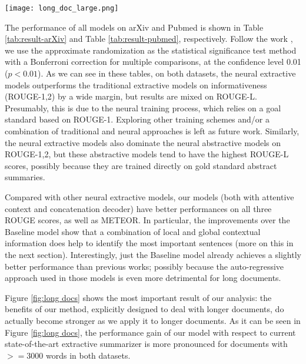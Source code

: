 \begin{figure*}[htbp!]
    \centering
    \texttt{[image: long\_doc\_large.png]}
    \caption{A Comparison between our model, SummaRuNNer and Oracle when applied to documents with increasing length, left-up: ROUGE-1 on Pubmed dataset, right-up: ROUGE-2 on Pubmed dataset, left-down: ROUGE-1 on arXiv dataset, right-down: ROUGE-2 on arXiv dataset}
    \label{fig:long docs}
\end{figure*} \squeezeup

The performance of all models on  arXiv  and Pubmed is shown in Table \ref{tab:result-arXiv} and Table \ref{tab:result-pubmed}, respectively. Follow the work \cite{EMNLP2018}, we use the approximate randomization as the statistical significance test method \cite{statsig} with a  Bonferroni correction for multiple comparisons, at the confidence level 0.01 ($p<0.01$).  
As we can see in these tables, on both datasets, the neural extractive models outperforms  the traditional extractive models on informativeness (ROUGE-1,2) by a wide margin, but results are mixed on ROUGE-L. Presumably, this is due to the neural training process, which relies on a goal standard based on ROUGE-1. Exploring other training schemes and/or a combination of traditional and neural approaches is left as future work. Similarly, the neural extractive models also dominate the neural abstractive models on ROUGE-1,2, but these abstractive models tend to have the highest ROUGE-L scores, possibly because they are trained directly  on gold standard abstract summaries.

Compared with other neural extractive models, our models (both with attentive context and concatenation decoder) have better performances on all three ROUGE scores, as well as METEOR. In particular, the improvements over the Baseline model show that a combination of local and global contextual information does help to identify the most important sentences (more on this in the next section). Interestingly, just the Baseline model already achieves a slightly better performance than  previous works; possibly because the auto-regressive approach used in those models is  even more detrimental for long documents.

Figure \ref{fig:long docs} shows the most important result of our analysis: the benefits of our method, explicitly designed %
to deal with longer documents, do actually become stronger as we apply it to longer documents. As it can be seen in Figure \ref{fig:long docs}, the performance gain of our model with respect to current state-of-the-art extractive summarizer is more pronounced for documents with $>= 3000$ words in both datasets. 

